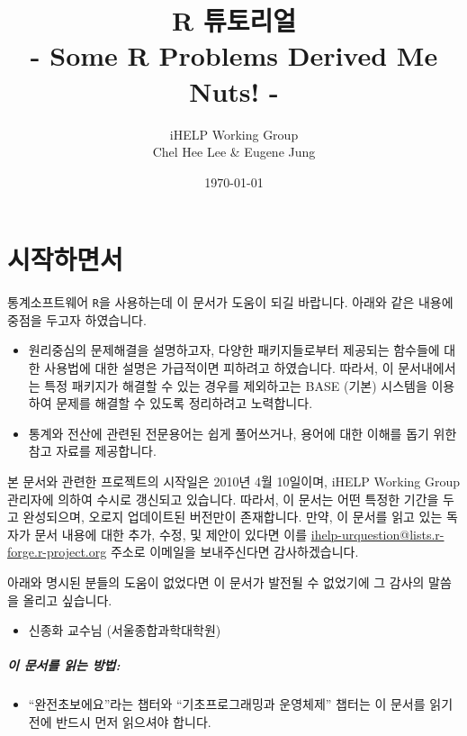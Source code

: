 \documentclass{report}
\title{R 튜토리얼 \\ - Some R Problems Derived Me Nuts! -}
\author{iHELP Working Group \\ Chel Hee Lee \& Eugene Jung }
\date{\today}
\begin{document}
\maketitle



\chapter{시작하면서}

통계소프트웨어 \texttt{R}을 사용하는데 이 문서가 도움이 되길 바랍니다. 
아래와 같은 내용에 중점을 두고자 하였습니다. 

\begin{itemize}
\item 원리중심의 문제해결을 설명하고자, 다양한 패키지들로부터 제공되는 함수들에 대한 사용법에 대한 설명은 가급적이면 피하려고 하였습니다.
따라서, 이 문서내에서는 특정 패키지가 해결할 수 있는 경우를 제외하고는 BASE (기본) 시스템을 이용하여 문제를 해결할 수 있도록 정리하려고 노력합니다.
\item 통계와 전산에 관련된 전문용어는 쉽게 풀어쓰거나, 용어에 대한 이해를 돕기 위한 참고 자료를 제공합니다. 
\end{itemize}

본 문서와 관련한 프로젝트의 시작일은 2010년 4월 10일이며, iHELP Working Group 관리자에 의하여 수시로 갱신되고 있습니다.
따라서, 이 문서는 어떤 특정한 기간을 두고 완성되으며, 오로지 업데이트된 버전만이 존재합니다.
만약, 이 문서를 읽고 있는 독자가 문서 내용에 대한 추가, 수정, 및 제안이 있다면 이를 \href{mailto:ihelp-urquestion@lists.r-forge.r-project.org}{ihelp-urquestion@lists.r-forge.r-project.org} 주소로 이메일을 보내주신다면 감사하겠습니다. 

아래와 명시된 분들의 도움이 없었다면 이 문서가 발전될 수 없었기에 그 감사의 말씀을 올리고 싶습니다. 
\begin{itemize}
\item 신종화 교수님 (서울종합과학대학원)
\end{itemize}

\paragraph{이 문서를 읽는 방법:} 
\begin{itemize}
\item ``완전초보에요''라는 챕터와 ``기초프로그래밍과 운영체제'' 챕터는 이 문서를 읽기 전에 반드시 먼저 읽으셔야 합니다.  
\end{itemize}

%
%
%
\end{document}
